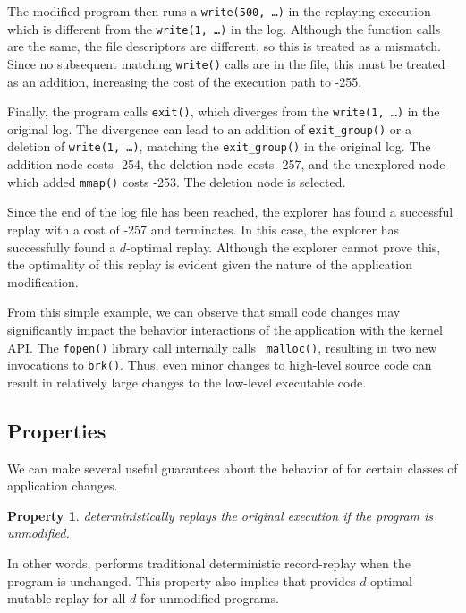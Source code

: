 The modified program then runs a {\tt write(500, \ldots)} in the
replaying execution which is different from the {\tt write(1, \ldots)}
in the log. Although the function calls are the same, the file
descriptors are different, so this is treated as a mismatch.  Since no
subsequent matching {\tt write()} calls are in the file, this must be
treated as an addition, increasing the cost of the execution path to -255.

Finally, the program calls {\tt exit()}, which diverges
from the {\tt write(1, \ldots)} in the original log. The
divergence can lead to an addition of {\tt exit\_group()}
or a deletion of {\tt write(1, \ldots)}, matching the
{\tt exit\_group()} in the original log.
The addition node costs -254, the deletion node costs -257, and the unexplored node
which added {\tt mmap()} costs -253. The deletion node is selected.

Since the end of the log file has been reached, the explorer has found a
successful replay with a cost of -257 and terminates. In this case, the explorer
has successfully found a $d$-optimal replay. Although the explorer cannot prove
this, the optimality of this replay is evident given the nature of the
application modification.

From this simple example, we can observe that small code
changes may significantly impact the behavior interactions of the application
with the kernel API.  The {\tt fopen()} library call internally calls {\tt
malloc()}, resulting in two new invocations to {\tt brk()}. Thus, even minor
changes to high-level source code can result in relatively large changes to the
low-level executable code.
\subsection{Properties}
\label{sec:properties}

We can make several useful guarantees about the behavior of {\dora}
for certain classes of application changes.

\newtheorem{property}{Property}

\begin{property}
	{\dora} deterministically replays the original execution
        if the program is unmodified.
\end{property}
        In other words, {\dora} performs traditional
        deterministic record-replay when the program is unchanged.
        This property also implies that {\dora} provides
        $d$-optimal mutable replay for all $d$ for unmodified programs.


